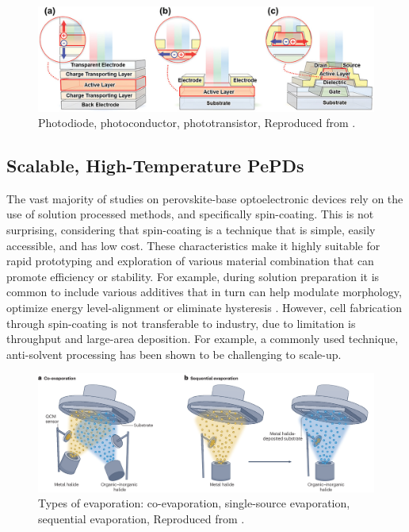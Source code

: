 \begin{figure}[htbp]
  \centering
  \medskip
  \includegraphics[width=.9\textwidth]{chapters/introduction/image/types_of_detector.jpg}
  \caption[Short caption for Table of Figures]{Photodiode, photoconductor, phototransistor, Reproduced from \cite{Yoo2021ADirections}.}
  \label{fig:ch2:types_of_detector}
\end{figure}

\subsection{Scalable, High-Temperature PePDs}



The vast majority of studies on perovskite-base optoelectronic devices rely on the use of solution processed methods, and specifically spin-coating. This is not surprising, considering that spin-coating is a technique that is simple, easily accessible, and has low cost. These characteristics make it highly suitable for rapid prototyping and exploration of various material combination that can promote efficiency or stability. For example, during solution preparation it is common to include various additives that in turn can help modulate morphology, optimize energy level-alignment or eliminate hysteresis \cite{Liu2020ACells}. However, cell fabrication through spin-coating is not transferable to industry, due to limitation is throughput and large-area deposition. For example, a commonly used technique, anti-solvent processing has been shown to be challenging to scale-up\cite{Saki2021Solution-processedCells}.

\begin{figure}[htbp]
  \centering
  \medskip
  \includegraphics[width=.99\textwidth]{chapters/introduction/image/types_of_evaporation.png}
  \caption[Short caption for Table of Figures]{Types of evaporation: co-evaporation, single-source evaporation, sequential evaporation, Reproduced from \cite{Han2025PerovskiteCells}.}
  \label{fig:ch2:types_of_evaporation}
\end{figure}

